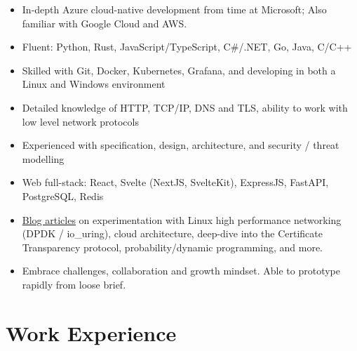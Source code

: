   \begin{itemize}
    \setlength\itemsep{0.1\parskip}
    \item In-depth Azure cloud-native development from time at Microsoft; Also familiar with Google Cloud and AWS.
    \item Fluent: Python, Rust, JavaScript/TypeScript, C\#/.NET, Go, Java, C/C++
    \item Skilled with Git, Docker, Kubernetes, Grafana, and developing in both a Linux and Windows environment
    \item Detailed knowledge of HTTP, TCP/IP, DNS and TLS, ability to work with low level network protocols
    \item Experienced with specification, design, architecture, and security / threat modelling
    \item Web full-stack: React, Svelte (NextJS, SvelteKit), ExpressJS, FastAPI, PostgreSQL, Redis
    \item \href{https://blog.maowtm.org/}{\color{link}Blog articles} on experimentation with Linux high performance networking (DPDK / io\_uring), cloud architecture, deep-dive into the Certificate Transparency protocol, probability/dynamic programming, and more.
    \item Embrace challenges, collaboration and growth mindset. Able to prototype rapidly from loose brief.
  \end{itemize}

  \section{Work Experience}

